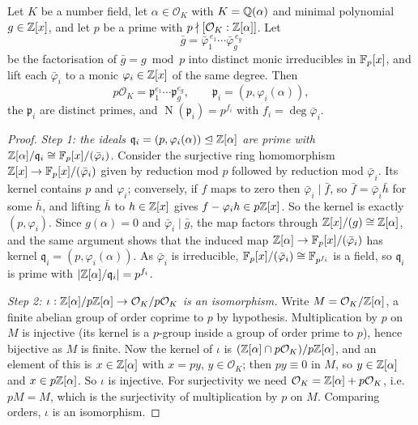 \documentclass[a4paper]{scrartcl}
\renewcommand{\OO}{\mathcal{O}}
\newcommand{\Nm}{\operatorname{N}}
\newcommand{\fp}{\mathfrak{p}}
\newcommand{\fq}{\mathfrak{q}}
\begin{document}
\begin{theorem}\label{thm:dedekindcrit}
	Let $K$ be a number field, let $\alpha \in \OO_K$ with $K = \mathbb{Q}(\alpha)$ and minimal polynomial $g \in \mathbb{Z}[x]$, and let $p$ be a prime with $p \nmid [\OO_K : \Z[\alpha]]$. Let
	$$\bar g = \bar\varphi_1^{\,e_1}\cdots\bar\varphi_g^{\,e_g}$$
	be the factorisation of $\bar g = g \bmod p$ into distinct monic irreducibles in $\mathbb{F}_p[x]$, and lift each $\bar\varphi_i$ to a monic $\varphi_i \in \mathbb{Z}[x]$ of the same degree. Then
	$$p\OO_K = \fp_1^{e_1}\cdots\fp_g^{e_g}, \qquad \fp_i = \left(p, \varphi_i(\alpha)\right),$$
	the $\fp_i$ are distinct primes, and $\Nm(\fp_i) = p^{f_i}$ with $f_i = \deg\bar\varphi_i$.
\end{theorem}

\begin{proof}
	\emph{Step 1: the ideals $\fq_i = (p,\varphi_i(\alpha)) \trianglelefteq \Z[\alpha]$ are prime with $\Z[\alpha]/\fq_i \cong \F_p[x]/(\bar\varphi_i)$.} Consider the surjective ring homomorphism $\mathbb{Z}[x] \to \mathbb{F}_p[x]/(\bar\varphi_i)$ given by reduction mod $p$ followed by reduction mod $\bar\varphi_i$. Its kernel contains $p$ and $\varphi_i$; conversely, if $f$ maps to zero then $\bar\varphi_i \mid \bar f$, so $\bar f = \bar\varphi_i\bar h$ for some $\bar h$, and lifting $\bar h$ to $h \in \mathbb{Z}[x]$ gives $f - \varphi_i h \in p\mathbb{Z}[x]$. So the kernel is exactly $(p, \varphi_i)$. Since $g(\alpha) = 0$ and $\bar\varphi_i \mid \bar g$, the map factors through $\mathbb{Z}[x]/(g) \cong \mathbb{Z}[\alpha]$, and the same argument shows that the induced map $\mathbb{Z}[\alpha] \to \mathbb{F}_p[x]/(\bar\varphi_i)$ has kernel $\fq_i = (p,\varphi_i(\alpha))$. As $\bar\varphi_i$ is irreducible, $\mathbb{F}_p[x]/(\bar\varphi_i) \cong \mathbb{F}_{p^{f_i}}$ is a field, so $\fq_i$ is prime with $\abs{\Z[\alpha]/\fq_i} = p^{f_i}$.

	\emph{Step 2: $\iota : \Z[\alpha]/p\Z[\alpha] \to \OO_K/p\OO_K$ is an isomorphism.} Write $M = \OO_K/\Z[\alpha]$, a finite abelian group of order coprime to $p$ by hypothesis. Multiplication by $p$ on $M$ is injective (its kernel is a $p$-group inside a group of order prime to $p$), hence bijective as $M$ is finite. Now the kernel of $\iota$ is $(\Z[\alpha]\cap p\OO_K)/p\Z[\alpha]$, and an element of this is $x \in \mathbb{Z}[\alpha]$ with $x = py$, $y \in \OO_K$; then $py \equiv 0$ in $M$, so $y \in \mathbb{Z}[\alpha]$ and $x \in p\mathbb{Z}[\alpha]$. So $\iota$ is injective. For surjectivity we need $\OO_K = \Z[\alpha] + p\OO_K$, i.e.\ $pM = M$, which is the surjectivity of multiplication by $p$ on $M$. Comparing orders, $\iota$ is an isomorphism.


\end{proof}
\end{document}
